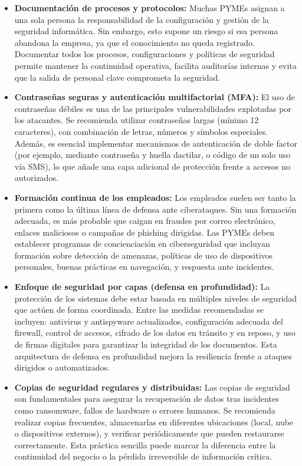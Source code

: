 \documentclass[a4paper, 10pt]{article}
\begin{document}
\begin{itemize}
    
    \item \textbf{Documentación de procesos y protocolos:}  
    Muchas PYMEs asignan a una sola persona la responsabilidad de la configuración y gestión de la seguridad informática. Sin embargo, esto supone un riesgo si esa persona abandona la empresa, ya que el conocimiento no queda registrado. Documentar todos los procesos, configuraciones y políticas de seguridad permite mantener la continuidad operativa, facilita auditorías internas y evita que la salida de personal clave comprometa la seguridad.

    \item \textbf{Contraseñas seguras y autenticación multifactorial (MFA):}  
    El uso de contraseñas débiles es una de las principales vulnerabilidades explotadas por los atacantes. Se recomienda utilizar contraseñas largas (mínimo 12 caracteres), 
    con combinación de letras, números y símbolos especiales. Además, es esencial implementar mecanismos de autenticación de doble factor (por ejemplo, mediante contraseña y huella dactilar, o código de un solo uso vía SMS), lo que añade una capa adicional de protección frente a accesos no autorizados.

    \item \textbf{Formación continua de los empleados:}  
    Los empleados suelen ser tanto la primera como la última línea de defensa ante ciberataques. Sin una formación adecuada, es más probable que caigan en fraudes por correo electrónico, 
    enlaces maliciosos o campañas de phishing dirigidas. Las PYMEs deben establecer programas de concienciación en ciberseguridad que incluyan formación sobre detección de amenazas, políticas de uso de dispositivos personales, buenas prácticas en navegación, y respuesta ante incidentes.

    \item \textbf{Enfoque de seguridad por capas (defensa en profundidad):}  
    La protección de los sistemas debe estar basada en múltiples niveles de seguridad que actúen de forma coordinada. Entre las medidas recomendadas se incluyen: 
    antivirus y antispyware actualizados, configuración adecuada del firewall, control de accesos, cifrado de los datos en tránsito y en reposo, y uso de firmas digitales para garantizar la integridad de los documentos. Esta arquitectura de defensa en profundidad mejora la resiliencia frente a ataques dirigidos o automatizados.

    \item \textbf{Copias de seguridad regulares y distribuidas:}  
    Las copias de seguridad son fundamentales para asegurar la recuperación de datos tras incidentes como ransomware, fallos de hardware o errores humanos. Se recomienda realizar copias frecuentes, almacenarlas en diferentes ubicaciones (local, nube o dispositivos externos), y verificar periódicamente que pueden restaurarse correctamente. Esta práctica sencilla puede marcar la diferencia entre la continuidad del negocio o la pérdida irreversible de información crítica.

\end{itemize}
\end{document}
